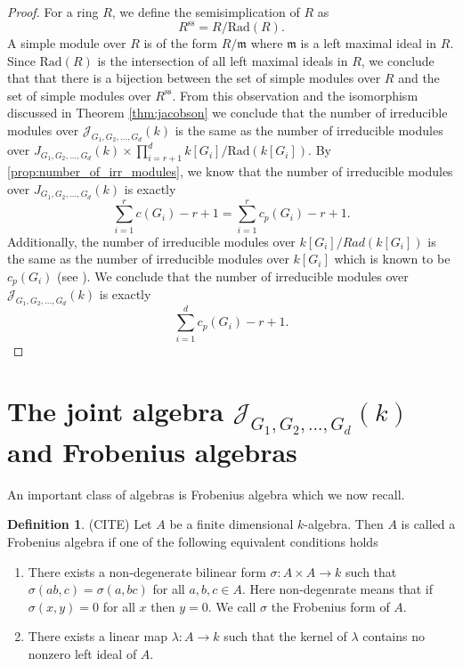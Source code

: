 \documentclass[12pt, a4paper]{amsart}
\numberwithin{equation}{section} %
\theoremstyle{plain}
\theoremstyle{definition}
\newtheorem{defn}[thm]{Definition}
\theoremstyle{plain}
\theoremstyle{remark}
\newcommand{\sJ}{\mathcal{J}}
\newcommand{\Rad}{\text{Rad}}
\newcommand{\se}{\text{ss}}
\begin{document}
\begin{proof}
For a ring $R$, we define the semisimplication of $R$ as 
\[ R^{\se} = R/\Rad(R) .\] 
A simple module over $R$ is of the form $R/\mathfrak{m}$ where $\mathfrak{m}$ is a left maximal ideal in $R$. Since $\Rad(R)$ is the intersection of all left maximal ideals in $R$, we conclude that that there is a bijection between the set of simple modules over $R$ and the set of simple modules over $R^{\se}.$  From this observation and the isomorphism discussed in Theorem \ref{thm:jacobson}
we conclude that the number of irreducible modules over $\sJ_{G_1, G_2, \ldots, G_d}(k)$ is the same as the number of irreducible modules over $J_{G_1, G_2, \ldots, G_d}(k) \times \prod_{i=r+1}^d k[G_i]/\Rad(k[G_i])$. By \ref{prop:number_of_irr_modules}, we know that the number of irreducible modules over $J_{G_1, G_2, \ldots, G_d}(k)$ is exactly 
\[ \sum_{i=1}^r c(G_i) -r+1 = \sum_{i=1}^r c_p(G_i)-r+1 .\] 
Additionally, the number of irreducible modules over $k[G_i]/Rad(k[G_i])$ is the same as the number of irreducible modules over $k[G_i]$ which is known to be $c_p(G_i)$ (see \cite{reiner1964number}). We conclude that the number of irreducible modules over $\sJ_{G_1, G_2, \ldots, G_d}(k)$ is exactly 
\[ \sum_{i=1}^d c_p(G_i)-r+1 .\]

\end{proof}

\section{The joint algebra $\sJ_{G_1, G_2, \ldots, G_d}(k)$ and Frobenius algebras}

An important class of algebras is Frobenius algebra which we now recall. 
\begin{defn} (CITE)
Let $A$ be a finite dimensional $k$-algebra. Then $A$ is called a Frobenius algebra if one of the following equivalent conditions holds 
\begin{enumerate}
    \item There exists a non-degenerate bilinear form $\sigma: A \times A \to k$ such that $\sigma(ab,c)=\sigma(a,bc)$ for all $a,b, c \in A.$ Here non-degenrate means that if $\sigma(x,y)=0$ for all $x$ then $y=0.$ We call $\sigma$ the Frobenius form of $A.$
    \item There exists a linear map $\lambda: A \to k$ such that the kernel of $\lambda$ contains no nonzero left ideal of $A.$
\end{enumerate}
\end{defn}
\end{document}
